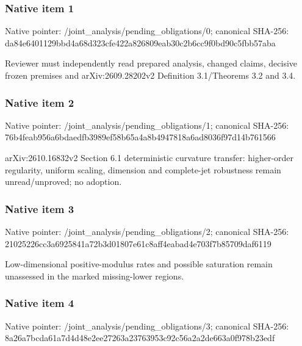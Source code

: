 \documentclass[10pt,a4paper]{article}
\begin{document}
\subsubsection{Native item 1}
Native pointer: /joint\_\allowbreak{}analysis/pending\_\allowbreak{}obligations/0; canonical SHA-256: da84e6401129bbd4a68d323cfe422a826809eab30c2b6cc9f0bd90c5fbb57aba

\begingroup\raggedright\sloppy Reviewer must independently read prepared analysis,\allowbreak{} changed claims,\allowbreak{} decisive frozen premises and arXiv:\allowbreak{}2609.28202v2 Definition 3.1/\allowbreak{}Theorems 3.2 and 3.4.\par\endgroup

\subsubsection{Native item 2}
Native pointer: /joint\_\allowbreak{}analysis/pending\_\allowbreak{}obligations/1; canonical SHA-256: 76b4feab956a6bdaedfb3989ef58b65a4a8b4947818a6ad8036f97d14b761566

\begingroup\raggedright\sloppy arXiv:\allowbreak{}2610.16832v2 Section 6.1 deterministic curvature transfer:\allowbreak{} higher-order regularity,\allowbreak{} uniform scaling,\allowbreak{} dimension and complete-jet robustness remain unread/\allowbreak{}unproved;\allowbreak{} no adoption.\par\endgroup

\subsubsection{Native item 3}
Native pointer: /joint\_\allowbreak{}analysis/pending\_\allowbreak{}obligations/2; canonical SHA-256: 21025226cc3a6925841a72b3d01807e61c8aff4eabad4e703f7b85709daf6119

\begingroup\raggedright\sloppy Low-dimensional positive-modulus rates and possible saturation remain unassessed in the marked missing-lower regions.\par\endgroup

\subsubsection{Native item 4}
Native pointer: /joint\_\allowbreak{}analysis/pending\_\allowbreak{}obligations/3; canonical SHA-256: 8a26a7bcda61a7d4d48e2ee27263a23763953c92c56a2a2de663a0f978b23edf
\end{document}
